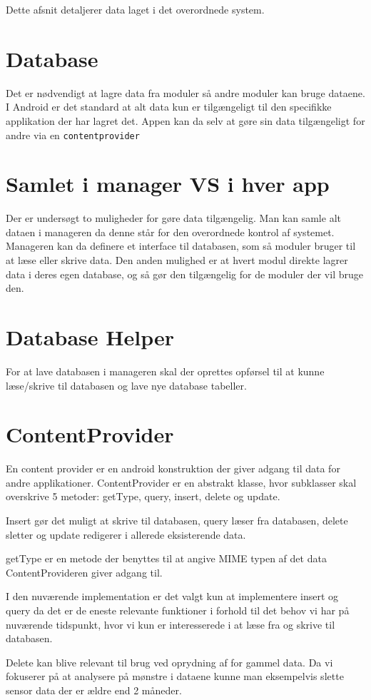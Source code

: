 Dette afsnit detaljerer data laget i det overordnede system. 

\section{Database}
Det er nødvendigt at lagre data fra moduler så andre moduler kan bruge dataene.
I Android er det standard at alt data kun er tilgængeligt til den specifikke applikation der har lagret det.
Appen kan da selv at gøre sin data tilgængeligt for andre via en \texttt{contentprovider}

\section{Samlet i manager VS i hver app}
Der er undersøgt to muligheder for gøre data tilgængelig.
Man kan samle alt dataen i manageren da denne står for den overordnede kontrol af systemet. 
Manageren kan da definere et interface til databasen, som så moduler bruger til at læse eller skrive data. 
Den anden mulighed er at hvert modul direkte lagrer data i deres egen database, og så gør den tilgængelig for de moduler der vil bruge den.


\section{Database Helper}
For at lave databasen i manageren skal der oprettes opførsel til at kunne læse/skrive til databasen og lave nye database tabeller.

\section{ContentProvider}
En content provider er en android konstruktion der giver adgang til data for andre applikationer.
ContentProvider er en abstrakt klasse, hvor subklasser skal overskrive 5 metoder:  getType, query, insert, delete og update. \cite{contentprovider}

Insert gør det muligt at skrive til databasen, query læser fra databasen, delete sletter og update redigerer i allerede eksisterende data.

getType er en metode der benyttes til at angive MIME typen af det data ContentProvideren giver adgang til.

I den nuværende implementation er det valgt kun at implementere insert og query da det er de eneste relevante funktioner i forhold til det behov vi har på nuværende tidspunkt, hvor vi kun er interesserede i at læse fra og skrive til databasen.

Delete kan blive relevant til brug ved oprydning af for gammel data. Da vi fokuserer på at analysere på mønstre i dataene kunne man eksempelvis slette sensor data der er ældre end 2 måneder.
